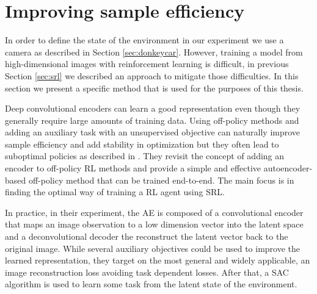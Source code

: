 \section{Improving sample efficiency} \label{sec:sampleefficiency}

In order to define the state of the environment in our experiment we use a camera as described in Section \ref{sec:donkeycar}. However, training a model from high-dimensional images with reinforcement learning is difficult, in previous Section \ref{sec:srl} we described an approach to mitigate those difficulties. In this section we present a specific method that is used for the purposes of this thesis.

Deep convolutional encoders can learn a good representation even though they generally require large amounts of training data. Using off-policy methods and adding an auxiliary task with an unsupervised objective can naturally improve sample efficiency and add stability in optimization but they often lead to suboptimal policies as described in \citet{DBLP:journals/corr/abs-1910-01741}. They revisit the concept of adding an encoder to off-policy RL methods and provide a simple and  effective autoencoder-based off-policy method that can be trained end-to-end. The main focus is in finding the optimal way of training a RL agent using SRL.

In practice, in their experiment, the AE is composed of a convolutional encoder that maps an image observation to a low dimension vector into the latent space and a deconvolutional decoder the reconstruct the latent vector back to the original image. While several auxiliary objectives could be used to improve the learned representation, they target on the most general and widely applicable, an image reconstruction loss avoiding task dependent losses. After that, a SAC algorithm is used to learn some task from the latent state of the environment.

